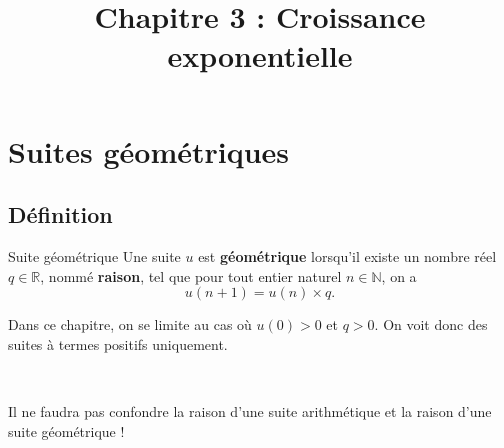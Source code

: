 \documentclass[11pt]{article}
\title{Chapitre 3 : Croissance exponentielle}
\date{}
\author{}
\begin{document}
\maketitle\thispagestyle{fancy}

%

\section{Suites géométriques}
\subsection{Définition}
\begin{defi}{Suite géométrique}
  Une suite $u$ est \textbf{géométrique} lorsqu'il existe un nombre réel
  $q\in\mathbb{R}$, nommé \textbf{raison}, tel que pour tout entier naturel
  $n\in\mathbb{N}$, on a
  \[
    u(n+1) = u(n)\times q.
  \]
\end{defi}
\begin{rmq}
  Dans ce chapitre, on se limite au cas où $u(0)>0$ et $q>0$. On voit donc des
  suites à termes positifs uniquement.
\end{rmq}~\\[-15mm]
\begin{rmq}
  Il ne faudra pas confondre la raison d'une suite arithmétique et la raison
  d'une suite géométrique !
\end{rmq}
\end{document}
